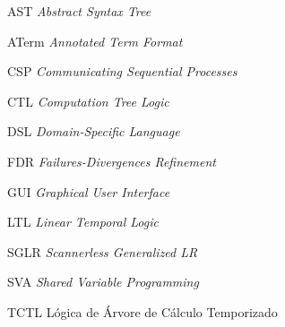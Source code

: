 \begin{siglas}
  \item[AST] \textit{Abstract Syntax Tree}
  \item[ATerm] \textit{Annotated Term Format}
  \item[CSP] \textit{Communicating Sequential Processes}
  \item[CTL] \textit{Computation Tree Logic}
  \item[DSL] \textit{Domain-Specific Language}
  \item[FDR] \textit{Failures-Divergences Refinement}
  \item[GUI] \textit{Graphical User Interface}
  \item[LTL] \textit{Linear Temporal Logic}
  \item[SGLR] \textit{Scannerless Generalized LR}
  \item[SVA] \textit{Shared Variable Programming}
  \item[TCTL] Lógica de Árvore de Cálculo Temporizado
\end{siglas}